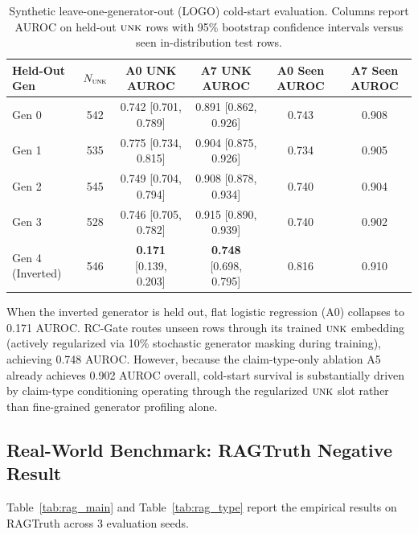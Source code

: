 \documentclass[pdflatex,sn-mathphys,Numbered]{sn-jnl}
\begin{document}
\begin{table}[htbp]
\caption{Synthetic leave-one-generator-out (LOGO) cold-start evaluation. Columns report AUROC on held-out $\textsc{unk}$ rows with 95\% bootstrap confidence intervals versus seen in-distribution test rows.}\label{tab:syn_logo}
\footnotesize
\setlength{\tabcolsep}{3.5pt}
\begin{tabular}{@{}lccccc@{}}
\toprule
\textbf{Held-Out Gen} & $N_{\textsc{unk}}$ & \textbf{A0 UNK AUROC} & \textbf{A7 UNK AUROC} & \textbf{A0 Seen AUROC} & \textbf{A7 Seen AUROC} \\
\midrule
Gen 0 & 542 & 0.742 [0.701, 0.789] & 0.891 [0.862, 0.926] & 0.743 & 0.908 \\
Gen 1 & 535 & 0.775 [0.734, 0.815] & 0.904 [0.875, 0.926] & 0.734 & 0.905 \\
Gen 2 & 545 & 0.749 [0.704, 0.794] & 0.908 [0.878, 0.934] & 0.740 & 0.904 \\
Gen 3 & 528 & 0.746 [0.705, 0.782] & 0.915 [0.890, 0.939] & 0.740 & 0.902 \\
Gen 4 (Inverted) & 546 & \textbf{0.171} [0.139, 0.203] & \textbf{0.748} [0.698, 0.795] & 0.816 & 0.910 \\
\bottomrule
\end{tabular}
\end{table}

When the inverted generator is held out, flat logistic regression (A0) collapses to 0.171 AUROC. RC-Gate routes unseen rows through its trained $\textsc{unk}$ embedding (actively regularized via 10\% stochastic generator masking during training), achieving 0.748 AUROC. However, because the claim-type-only ablation A5 already achieves 0.902 AUROC overall, cold-start survival is substantially driven by claim-type conditioning operating through the regularized $\textsc{unk}$ slot rather than fine-grained generator profiling alone.

\subsection{Real-World Benchmark: RAGTruth Negative Result}\label{subsec:results_ragtruth}

Table~\ref{tab:rag_main} and Table~\ref{tab:rag_type} report the empirical results on RAGTruth across 3 evaluation seeds.
\end{document}
